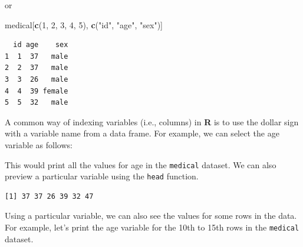 \documentclass[]{book}
\newenvironment{Shaded}{\begin{snugshade}}{\end{snugshade}}
\newcommand{\CommentTok}[1]{\textcolor[rgb]{0.56,0.35,0.01}{\textit{#1}}}
\newcommand{\DecValTok}[1]{\textcolor[rgb]{0.00,0.00,0.81}{#1}}
\newcommand{\KeywordTok}[1]{\textcolor[rgb]{0.13,0.29,0.53}{\textbf{#1}}}
\newcommand{\NormalTok}[1]{#1}
\newcommand{\OperatorTok}[1]{\textcolor[rgb]{0.81,0.36,0.00}{\textbf{#1}}}
\newcommand{\StringTok}[1]{\textcolor[rgb]{0.31,0.60,0.02}{#1}}
\begin{document}
or

\begin{Shaded}
\begin{Highlighting}[]
\NormalTok{medical[}\KeywordTok{c}\NormalTok{(}\DecValTok{1}\NormalTok{, }\DecValTok{2}\NormalTok{, }\DecValTok{3}\NormalTok{, }\DecValTok{4}\NormalTok{, }\DecValTok{5}\NormalTok{), }\KeywordTok{c}\NormalTok{(}\StringTok{"id"}\NormalTok{, }\StringTok{"age"}\NormalTok{, }\StringTok{"sex"}\NormalTok{)]}
\end{Highlighting}
\end{Shaded}

\begin{verbatim}
  id age    sex
1  1  37   male
2  2  37   male
3  3  26   male
4  4  39 female
5  5  32   male
\end{verbatim}

A common way of indexing variables (i.e., columns) in \textbf{R} is to use the dollar sign with a variable name from a data frame. For example, we can select the age variable as follows:

\begin{Shaded}
\end{Shaded}

This would print all the values for age in the \texttt{medical} dataset. We can also preview a particular variable using the \texttt{head} function.

\begin{Shaded}
\end{Shaded}

\begin{verbatim}
[1] 37 37 26 39 32 47
\end{verbatim}

Using a particular variable, we can also see the values for some rows in the data. For example, let's print the age variable for the 10th to 15th rows in the \texttt{medical} dataset.

\begin{Shaded}
\end{Shaded}
\end{document}
